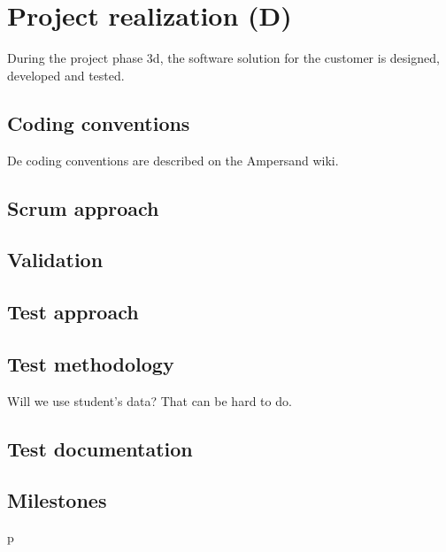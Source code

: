 \section{Project realization (D)}
\label{sec:project-realization}
%
During the project phase 3d, the software solution for the customer is designed, developed and tested.

\subsection{Coding conventions}
%
De coding conventions are described on the Ampersand wiki\cite{ampersand-wiki}.

\subsection{Scrum approach}
\lipsum[1]

\subsection{Validation}
\lipsum[1]

\subsection{Test approach}
\lipsum[1]

\subsection{Test methodology}
Will we use student's data? That can be hard to do.

\subsection{Test documentation}
\lipsum[1]

\subsection{Milestones}
\lipsum[1]p
